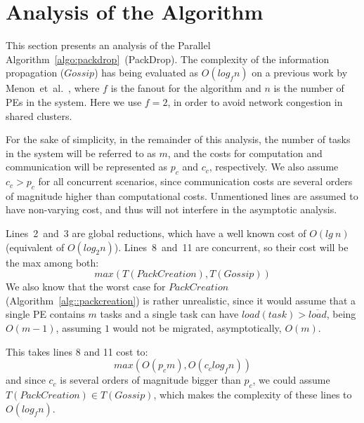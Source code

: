 \section{Analysis of the Algorithm}

This section presents an analysis of the Parallel Algorithm~\ref{algo:packdrop}~(PackDrop). 
The complexity of the information propagation ($Gossip$) has being evaluated as $O(log_fn)$ on a previous work by Menon~et~al.~\cite{grapevine},
where $f$ is the fanout for the algorithm and $n$ is the number of PEs in the system.
Here we use $f=2$, in order to avoid network congestion in shared clusters.

For the sake of simplicity, in the remainder of this analysis, the number of tasks in the system
will be referred to as $m$, and the costs for computation and communication will be represented as $p_c$ and $c_c$, respectively.
We also assume $c_c > p_c$ for all concurrent scenarios, since communication costs are several orders of magnitude higher than computational costs.
Unmentioned lines are assumed to have non-varying cost, and thus will not interfere in the asymptotic analysis.

Lines~2~and~3 are global reductions, which have a well known cost of $O(lg\ n)$ (equivalent of $O(log_2n)$).
Lines~8~and~11 are concurrent, so their cost will be the max among both:
\begin{equation*}
  max(T(PackCreation),T(Gossip))
\end{equation*}
We also know that the worst case for $PackCreation$ (Algorithm~\ref{alg::packcreation}) is rather unrealistic, 
since it would assume that a single PE contains $m$ tasks and a single task can have $load(task) > \overline{load}$, being $O(m-1)$, assuming $1$ would not be migrated, asymptotically, $O(m)$.


This takes lines 8 and 11 cost to:
\begin{equation*}
 max(O(p_cm),O(c_clog_fn))
\end{equation*}
and since $c_c$ is several orders of magnitude bigger than $p_c$, we could assume $T(PackCreation)\in T(Gossip)$, which makes the 
complexity of these lines to $O(log_fn)$.

